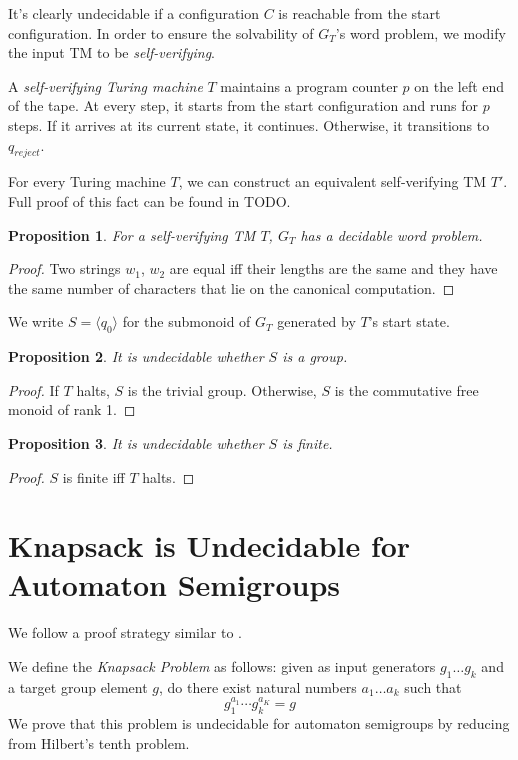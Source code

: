 \documentclass[10pt]{article} %
\newtheorem{proposition}{Proposition}
\newcommand{\defn}[1]{\textit{#1}}
\begin{document}
    It's clearly undecidable if a configuration $C$ is reachable from the start configuration. In order to ensure the solvability of $G_T$'s word problem, we modify the input TM to be \defn{self-verifying}. 

    A \defn{self-verifying Turing machine} $T$ maintains a program counter $p$ on the left end of the tape. At every step, it starts from the start configuration and runs for $p$ steps. If it arrives at its current state, it continues. Otherwise, it transitions to $q_{reject}$. 

    For every Turing machine $T$, we can construct an equivalent self-verifying TM $T'$. Full proof of this fact can be found in TODO.

    \begin{proposition}
    For a self-verifying TM $T$, $G_T$ has a decidable word problem.
    \end{proposition}
    \begin{proof}
    Two strings $w_1$, $w_2$ are equal iff their lengths are the same and they have the same number of characters that lie on the canonical computation.
    \end{proof}

    We write $S = \langle q_0 \rangle$ for the submonoid of $G_T$ generated by $T$'s start state.

    \begin{proposition}
    It is undecidable whether $S$ is a group.
    \end{proposition}
    \begin{proof}
    If $T$ halts, $S$ is the trivial group. Otherwise, $S$ is the commutative free monoid of rank 1.
    \end{proof}

    \begin{proposition}
    It is undecidable whether $S$ is finite.
    \end{proposition}
    \begin{proof}
    $S$ is finite iff $T$ halts.
    \end{proof}

    \section{Knapsack is Undecidable for Automaton Semigroups} 
    We follow a proof strategy similar to \cite{Konig15:knapsack}.

    We define the \defn{Knapsack Problem} as follows: given as input generators $g_1 \ldots g_k$ and a target group element $g$, do there exist natural numbers $a_1\ldots a_k$ such that 
    \[ g_1^{a_1} \cdots g_k^{a_K} = g \]
    We prove that this problem is undecidable for automaton semigroups by reducing from %
    Hilbert's tenth problem.
\end{document}
